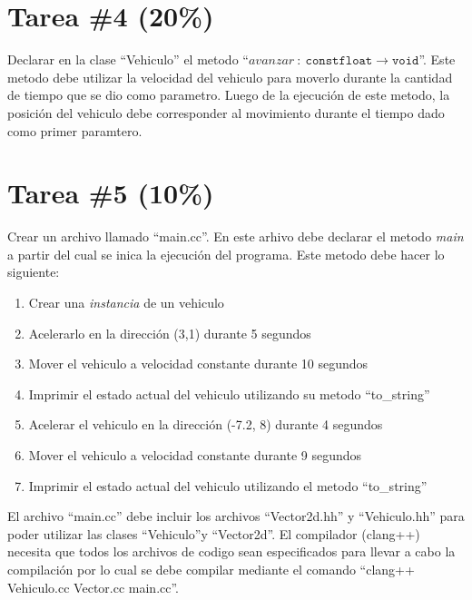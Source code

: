 \documentclass{article}
\begin{document}
\section*{Tarea \#4 (20\%)}
Declarar en la clase ``Vehiculo'' el metodo ``$avanzar\ :\ \mathtt{const float}\rightarrow\mathtt{void}$''.
Este metodo debe utilizar la velocidad del vehiculo para moverlo durante la cantidad de tiempo que
se dio como parametro. Luego de la ejecuci\'on de este metodo, la posici\'on del vehiculo
debe corresponder al movimiento durante el tiempo dado como primer paramtero.

\section*{Tarea \#5 (10\%)}
Crear un archivo llamado ``main.cc''. En este arhivo debe declarar el
metodo \emph{main} a partir del cual se inica la ejecuci\'on del programa.
Este metodo debe hacer lo siguiente:
\begin{enumerate}
        \item{Crear una \emph{instancia} de un vehiculo}
        \item{Acelerarlo en la direcci\'on (3,1) durante 5 segundos}
        \item{Mover el vehiculo a velocidad constante durante 10 segundos}
        \item{Imprimir el estado actual del vehiculo utilizando su metodo ``to\_string''}
        \item{Acelerar el vehiculo en la direcci\'on (-7.2, 8) durante 4 segundos}
        \item{Mover el vehiculo a velocidad constante durante 9 segundos}
        \item{Imprimir el estado actual del vehiculo utilizando el metodo ``to\_string''} 
\end{enumerate}
El archivo ``main.cc'' debe incluir los archivos ``Vector2d.hh'' y ``Vehiculo.hh''
para poder utilizar las clases ``Vehiculo''y ``Vector2d''. El compilador (clang++)
necesita que todos los archivos de codigo sean especificados para llevar a cabo
la compilaci\'on por lo cual se debe compilar mediante el comando ``clang++ Vehiculo.cc 
Vector.cc main.cc''.
\end{document}
